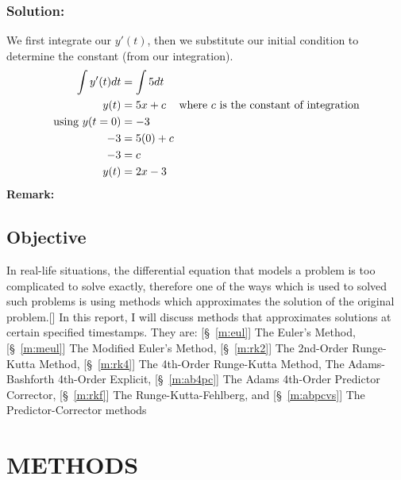 \documentclass[12pt,oneside]{book}
\begin{document}
\begin{spacing}{1.2}
				\subsection*{Solution:}
					We first integrate our $ y'(t) $, then we substitute our initial condition to determine the constant (from our integration).
					\begin{equation*}
						\begin{split}
							\int y'(t) dt & = \int 5 dt \\
							 y(t) & = 5x + c \hspace*{0.3cm} \text{ where $ c $ is the constant of integration} \\
							 \text{using } y(t = 0) & = -3 \\
							 -3 & = 5(0) + c \\
							 -3 & = c \\
							 y(t) & = 2x - 3
						\end{split}
					\end{equation*}
					\textbf{Remark: }  
			
			
			\section{Objective}
				In real-life situations, the differential equation that models a problem is too complicated to solve exactly, therefore one of the ways which is used to solved such problems is using methods which approximates the solution of the original problem.[] In this report, I will discuss methods that approximates solutions at certain specified timestamps. \newline
				They are: [\S\ \ref{m:eul}] The Euler's Method, [\S\ \ref{m:meul}] The Modified Euler's Method, [\S\ \ref{m:rk2}] The 2nd-Order Runge-Kutta Method, [\S\ \ref{m:rk4}] The 4th-Order Runge-Kutta Method, \newline [\S\ \ref{m:ab4e}] The Adams-Bashforth 4th-Order Explicit, [\S\ \ref{m:ab4pc}] The Adams 4th-Order Predictor Corrector, [\S\ \ref{m:rkf}] The Runge-Kutta-Fehlberg, and [\S\ \ref{m:abpcvs}] The Predictor-Corrector methods
			
		\end{spacing}
		
	
	\chapter{METHODS}
\end{document}
